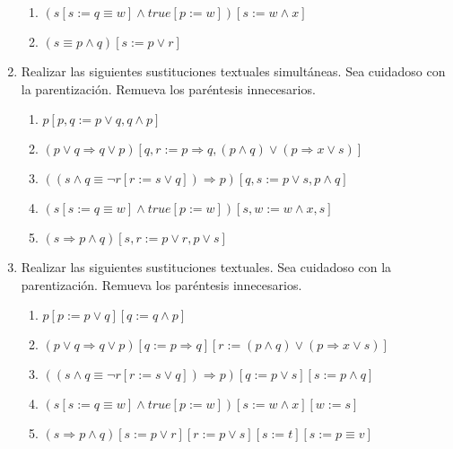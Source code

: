 \documentclass{article}
\begin{document}
\begin{enumerate}
\begin{enumerate}
		\item $(s[s := q \equiv w] \land true[p := w])[s := w \land x]$
		
		\item $(s \equiv p \land q)[s := p \lor r]$

	\end{enumerate}

    \item Realizar las siguientes sustituciones textuales simultáneas. Sea cuidadoso con la parentización.
Remueva los paréntesis innecesarios.
	\begin{enumerate}
		\item $p[p, q := p \lor q, q \land p]$
		
		\item $(p \lor q \Rightarrow q \lor p)[q, r := p \Rightarrow q, (p \land q) \lor (p \Rightarrow x \lor s)]$
		
		\item $((s \land q \equiv \neg r[r := s \lor q]) \Rightarrow p)[q, s := p \lor s, p \land q]$
		
		\item $(s[s := q \equiv w] \land true[p := w])[s, w := w \land x, s]$
		
		\item $(s \Rightarrow p \land q)[s, r := p \lor r, p \lor s]$
	\end{enumerate}

    \item Realizar las siguientes sustituciones textuales. Sea cuidadoso con la parentización. Remueva
los paréntesis innecesarios.

	\begin{enumerate}
		\item $p[p := p \lor q][q := q \land p]$
		
		\item $(p \lor q \Rightarrow q \lor p)[q := p \Rightarrow q][r := (p \land q) \lor (p \Rightarrow x \lor s)]$
		
		\item $((s \land q \equiv \neg r[r := s \lor q]) \Rightarrow p)[q := p \lor s][s := p \land q]$
		
		\item $(s[s := q \equiv w] \land true[p := w])[s := w \land x][w := s]$
		
		\item $(s \Rightarrow p \land q)[s := p \lor r][r := p \lor s][s := t][s := p \equiv v]$
	\end{enumerate}


\end{enumerate}
\end{document}
